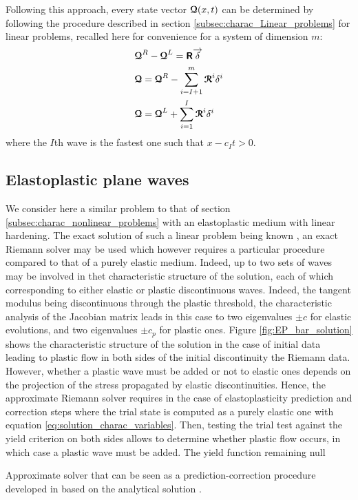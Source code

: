 Following this approach, every state vector ${\boldsymbol{\mathcal{Q}}}(x,t)$ can be determined by following the procedure described in section \ref{subsec:charac_Linear_problems} for linear problems, recalled here for convenience for a system of dimension $m$:%
\begin{align}
  &  {\boldsymbol{\mathcal{Q}}}^R-{\boldsymbol{\mathcal{Q}}}^L=\boldsymbol{\mathsf{R}} {\overrightarrow{\delta}} \\
  &  {\boldsymbol{\mathcal{Q}}} ={\boldsymbol{\mathcal{Q}}}^R -\sum_{i=I+1}^{m} {\boldsymbol{\mathcal{R}}}^i\delta^i \\
  &  {\boldsymbol{\mathcal{Q}}}={\boldsymbol{\mathcal{Q}}}^L+ \sum_{i=1}^{I} {\boldsymbol{\mathcal{R}}}^i\delta^i
\end{align}
where the $I$th wave is the fastest one such that $x-c_I t >0$.

\subsection{Elastoplastic plane waves}
We consider here a similar problem to that of section \ref{subsec:charac_nonlinear_problems} with an elastoplastic medium with linear hardening. The exact solution of such a linear problem being known \cite{Wang}, an exact Riemann solver may be used which however requires a particular procedure compared to that of a purely elastic medium. Indeed, up to two sets of waves may be involved in thet characteristic structure of the solution, each of which corresponding to either elastic or plastic discontinuous waves. Indeed, the tangent modulus being discontinuous through the plastic threshold, the characteristic analysis of the Jacobian matrix leads in this case to two eigenvalues $\pm c$ for elastic evolutions, and two eigenvalues $\pm c_p$ for plastic ones. Figure \ref{fig:EP_bar_solution} shows the characteristic structure of the solution in the case of initial data leading to plastic flow in both sides of the initial discontinuity the Riemann data. However, whether a plastic wave must be added or not to elastic ones depends on the projection of the stress propagated by elastic discontinuities. Hence, the approximate Riemann solver requires in the case of elastoplasticity prediction and correction steps where the trial state is computed as a purely elastic one with equation \eqref{eq:solution_charac_variables}. Then, testing the trial test against the yield criterion on both sides allows to determine whether plastic flow occurs, in which case a plastic wave must be added. The yield function remaining null 

Approximate solver that can be seen as a prediction-correction procedure developed in \cite{Fogarty} based on the analytical solution \cite{Wang}.

